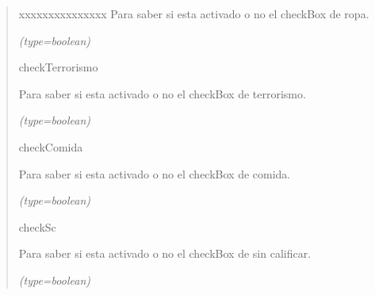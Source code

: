\begin{boxedminipage}{\funcwidth}
\begin{quote}
\begin{Ventry}{xxxxxxxxxxxxxxx}
          Para saber si esta activado o no el checkBox de ropa.

            {\it (type=boolean)}

          \item[checkTerrorismo]

          Para saber si esta activado o no el checkBox de terrorismo.

            {\it (type=boolean)}

          \item[checkComida]

          Para saber si esta activado o no el checkBox de comida.

            {\it (type=boolean)}

          \item[checkSc]

          Para saber si esta activado o no el checkBox de sin calificar.

            {\it (type=boolean)}

        \end{Ventry}

      \end{quote}

    \end{boxedminipage}

    \label{grafico:Grafico:sacarSeguidoresSegundoNivelAlgunasCategorias}

    \vspace{0.5ex}

